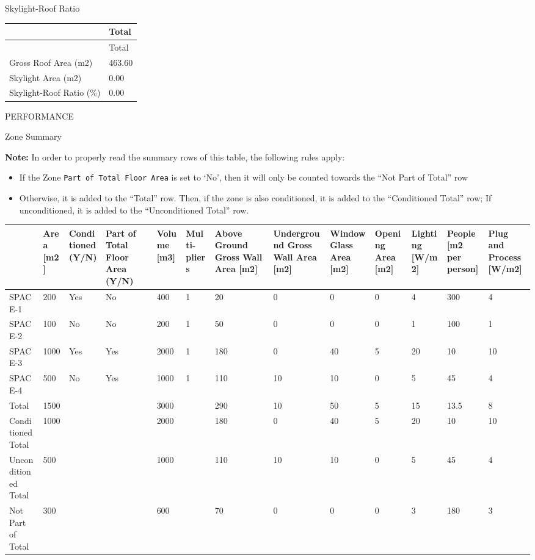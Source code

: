 Skylight-Roof Ratio

\begin{longtable}[c]{@{}ll@{}}
\toprule
~ & Total \tabularnewline
\midrule
\endfirsthead

\toprule
~ & Total \tabularnewline
\midrule
\endhead

Gross Roof Area (m2) & 463.60 \tabularnewline
Skylight Area (m2) & 0.00 \tabularnewline
Skylight-Roof Ratio (\%) & 0.00 \tabularnewline
\bottomrule
\end{longtable}

PERFORMANCE

Zone Summary

\textbf{Note:} In order to properly read the summary rows of this table, the following rules apply:

\begin{itemize}
    \item
        If the Zone \lstinline!Part of Total Floor Area! is set to `No', then it will only be counted towards the ``Not Part of Total'' row
    \item
        Otherwise, it is added to the ``Total'' row. Then, if the zone is also conditioned, it is added to the ``Conditioned Total'' row;
        If unconditioned, it is added to the ``Unconditioned Total'' row.
\end{itemize}

{\tiny
\begin{longtable}[c]{|p{0.8in}|p{0.25in}|p{0.50in}|p{0.35in}|p{0.30in}|p{0.30in}|p{0.35in}|p{0.5in}|p{0.30in}|p{0.30in}|p{0.30in}|p{0.35in}|p{0.35in}|}
\hline
 & Area {[}m2{]} & Conditioned (Y/N) & Part of Total Floor Area (Y/N) & Volume {[}m3{]} & Multi-pliers & Above Ground Gross Wall Area {[}m2{]} & Underground Gross Wall Area {[}m2{]} & Window Glass Area {[}m2{]} & Opening Area {[}m2{]} & Lighting {[}W/m2{]} & People {[}m2 per person{]} & Plug and Process {[}W/m2{]} \\ \hline
\endhead
%
SPACE-1 & 200 & {\color{DarkGreen}Yes} & {\color{red}No} & 400 & 1 & 20 & 0 & 0 & 0 & 4 & 300 & 4 \\ \hline
SPACE-2 & 100 & {\color{red}No} & {\color{red}No} & 200 & 1 & 50 & 0 & 0 & 0 & 1 & 100 & 1 \\ \hline
SPACE-3 & 1000 & {\color{DarkGreen}Yes} & {\color{DarkGreen}Yes} & 2000 & 1 & 180 & 0 & 40 & 5 & 20 & 10 & 10 \\ \hline
SPACE-4 & 500 & {\color{red}No} & {\color{DarkGreen}Yes} & 1000 & 1 & 110 & 10 & 10 & 0 & 5 & 45 & 4 \\ \hline
Total & 1500 &  &  & 3000 &  & 290 & 10 & 50 & 5 & 15 & 13.5 & 8 \\ \hline
Conditioned Total & 1000 &  &  & 2000 &  & 180 & 0 & 40 & 5 & 20 & 10 & 10 \\ \hline
Unconditioned Total & 500 &  &  & 1000 &  & 110 & 10 & 10 & 0 & 5 & 45 & 4 \\ \hline
Not Part of Total & 300 &  &  & 600 &  & 70 & 0 & 0 & 0 & 3 & 180 & 3 \\ \hline
\end{longtable}
}

